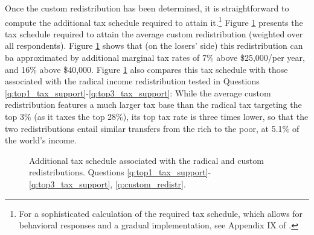 Once the custom redistribution has been determined, it is straightforward to compute the additional tax schedule required to attain it.\footnote{For a sophisticated calculation of the required tax schedule, which allows for behavioral responses and a gradual implementation, see Appendix IX of \cite{fabre_french_2022}.} Figure \ref{fig:tax_radical_redistr} presents the tax schedule required to attain the average custom redistribution (weighted over all respondents). Figure \ref{fig:tax_radical_redistr} shows that (on the losers' side) this redistribution can ba approximated by additional marginal tax rates of 7\% above \$25,000/per year, and 16\% above \$40,000. Figure \ref{fig:tax_radical_redistr} also compares this tax schedule with those associated with the radical income redistribution tested in Questions \ref{q:top1_tax_support}-\ref{q:top3_tax_support}: While the average custom redistribution features a much larger tax base than the radical tax targeting the top 3\% (as it taxes the top 28\%), its top tax rate is three times lower, so that the two redistributions entail similar transfers from the rich to the poor, at 5.1\% of the world's income. %

\begin{figure}[h!]
    \caption[Tax schedule of radical and custom redistributions]{Additional tax schedule associated with the radical and custom redistributions. Questions \ref{q:top1_tax_support}-\ref{q:top3_tax_support}, \ref{q:custom_redistr}.
    }\label{fig:tax_radical_redistr}
\end{figure}

